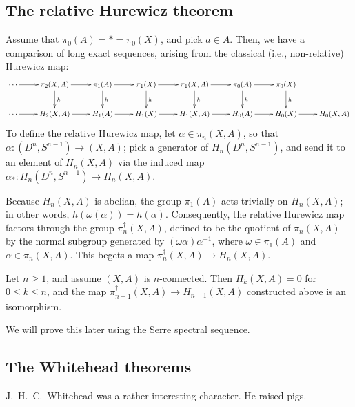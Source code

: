 \subsection{The relative Hurewicz theorem}
    Assume that $\pi_0(A) = \ast = \pi_0(X)$, and pick $a\in A$.
    Then, we have a comparison of long exact sequences, arising from the classical (i.e., non-relative) Hurewicz map:
    \begin{equation*}
	\xymatrix{
	    \cdots\ar[r] & \pi_2(X,A)\ar[r]\ar[d]^h & \pi_1(A)\ar[r]\ar[d]^h & \pi_1(X)\ar[r]\ar[d]^h & \pi_1(X,A)\ar[r]\ar[d]^h & \pi_0(A)\ar[r]\ar[d]^h & \pi_0(X)\ar[d]^h & \\
	    \cdots\ar[r] & H_2(X,A)\ar[r] & H_1(A)\ar[r] & H_1(X)\ar[r] & H_1(X,A)\ar[r] & H_0(A)\ar[r] & H_0(X)\ar[r] & H_0(X,A)
	    }
    \end{equation*}
To define the relative Hurewicz map, let $\alpha\in \pi_n(X,A)$, so that $\alpha:(D^n,S^{n-1})\to (X,A)$;
pick a generator of $H_n(D^n,S^{n-1})$, and send it to an element of $H_n(X,A)$ via the induced map
$\alpha_\ast:H_n(D^n,S^{n-1})\to H_n(X,A)$.

Because $H_n(X,A)$ is abelian, the group $\pi_1(A)$ acts trivially on $H_n(X,A)$; in other words,
$h(\omega(\alpha)) = h(\alpha)$.
Consequently, the relative Hurewicz map factors through the group $\pi_n^\dagger(X,A)$, defined to be
the quotient of $\pi_n(X,A)$ by the normal subgroup generated by $(\omega\alpha)\alpha^{-1}$,
where $\omega\in\pi_1(A)$ and $\alpha\in \pi_n(X,A)$.
This begets a map $\pi_n^\dagger(X,A)\to H_n(X,A)$.
\begin{theorem}
    Let $n\geq 1$, and assume $(X,A)$ is $n$-connected.
    Then $H_k(X,A) = 0$ for $0\leq k\leq n$, and the map $\pi_{n+1}^\dagger(X,A)\to H_{n+1}(X,A)$ constructed above
    is an isomorphism.
\end{theorem}
We will prove this later using the Serre spectral sequence.
\subsection{The Whitehead theorems}
J.~H.~C.~Whitehead was a rather interesting character. He raised pigs.

